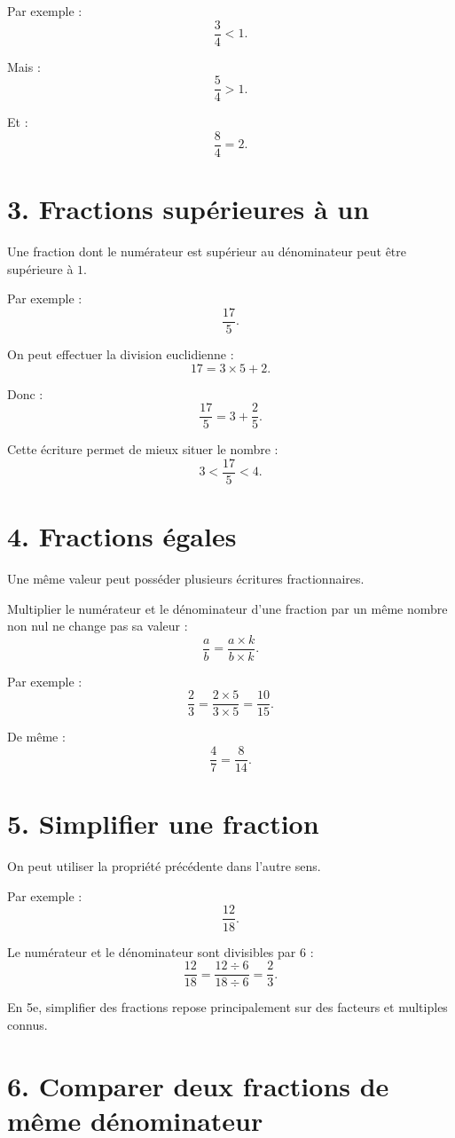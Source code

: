 Par exemple :
\[
\dfrac34<1.
\]

Mais :
\[
\dfrac54>1.
\]

Et :
\[
\dfrac84=2.
\]

\section{3. Fractions supérieures à un}

Une fraction dont le numérateur est supérieur au dénominateur peut être supérieure à $1$.

Par exemple :
\[
\dfrac{17}{5}.
\]

On peut effectuer la division euclidienne :
\[
17=3\times5+2.
\]

Donc :
\[
\dfrac{17}{5}
=
3+\dfrac25.
\]

Cette écriture permet de mieux situer le nombre :
\[
3<\dfrac{17}{5}<4.
\]

\section{4. Fractions égales}

Une même valeur peut posséder plusieurs écritures fractionnaires.

\begin{propriete}
Multiplier le numérateur et le dénominateur d'une fraction par un même nombre non nul ne change pas sa valeur :
\[
\dfrac ab=\dfrac{a\times k}{b\times k}.
\]
\end{propriete}

Par exemple :
\[
\dfrac23
=
\dfrac{2\times5}{3\times5}
=
\dfrac{10}{15}.
\]

De même :
\[
\dfrac47
=
\dfrac{8}{14}.
\]

\section{5. Simplifier une fraction}

On peut utiliser la propriété précédente dans l'autre sens.

Par exemple :
\[
\dfrac{12}{18}.
\]

Le numérateur et le dénominateur sont divisibles par $6$ :
\[
\dfrac{12}{18}
=
\dfrac{12\div6}{18\div6}
=
\dfrac23.
\]

En 5e, simplifier des fractions repose principalement sur des facteurs et multiples connus.

\section{6. Comparer deux fractions de même dénominateur}

